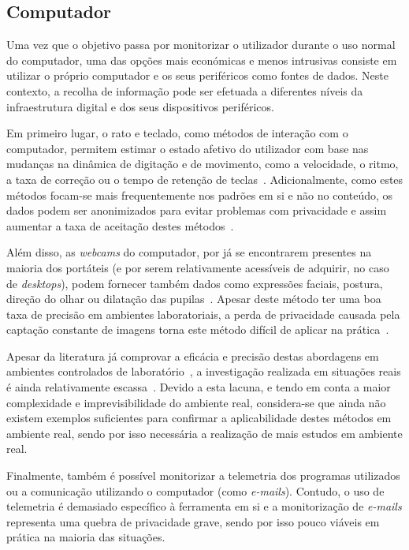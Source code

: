 \subsection{Computador}

Uma vez que o objetivo passa por monitorizar o utilizador durante o uso normal do computador, uma das opções mais económicas e menos intrusivas consiste em utilizar o próprio computador e os seus periféricos como fontes de dados.
Neste contexto, a recolha de informação pode ser efetuada a diferentes níveis da infraestrutura digital e dos seus dispositivos periféricos.

Em primeiro lugar, o rato e teclado, como métodos de interação com o computador, permitem estimar o estado afetivo do utilizador com base nas mudanças na dinâmica de digitação e de movimento, como a velocidade, o ritmo, a taxa de correção ou o tempo de retenção de teclas~\cite{Keystore_k2025,Zimmermann2003}.
Adicionalmente, como estes métodos focam-se mais frequentemente nos padrões em si e não no conteúdo, os dados podem ser anonimizados para evitar problemas com privacidade e assim aumentar a taxa de aceitação destes métodos~\cite{Kallio2025}.

Além disso, as \textit{webcams} do computador, por já se encontrarem presentes na maioria dos portáteis (e por serem relativamente acessíveis de adquirir, no caso de \textit{desktops}), podem fornecer também dados como expressões faciais, postura, direção do olhar ou dilatação das pupilas~\cite{Kallio2025,online_classes_sharma}.
Apesar deste método ter uma boa taxa de precisão em ambientes laboratoriais, a perda de privacidade causada pela captação constante de imagens torna este método difícil de aplicar na prática~\cite{Kallio2025}.

Apesar da literatura já comprovar a eficácia e precisão destas abordagens em ambientes controlados de laboratório~\cite{Kallio2025}, a investigação realizada em situações reais é ainda relativamente escassa~\cite{Kallio2025}.
Devido a esta lacuna, e tendo em conta a maior complexidade e imprevisibilidade do ambiente real, considera-se que ainda não existem exemplos suficientes para confirmar a aplicabilidade destes métodos em ambiente real, sendo por isso necessária a realização de mais estudos em ambiente real.

Finalmente, também é possível monitorizar a telemetria dos programas utilizados ou a comunicação utilizando o computador (como \textit{e-mails}). Contudo, o uso de telemetria é demasiado específico à ferramenta em si e a monitorização de \textit{e-mails} representa uma quebra de privacidade grave, sendo por isso pouco viáveis em prática na maioria das situações.

